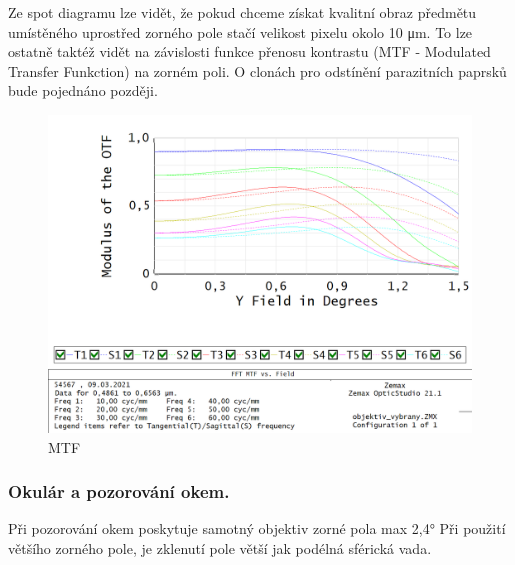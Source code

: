\documentclass[
]{article}
\begin{document}
Ze spot diagramu lze vidět, že pokud chceme získat kvalitní obraz
předmětu umístěného uprostřed zorného pole stačí velikost pixelu okolo
10 μm. To lze ostatně taktéž vidět na závislosti funkce přenosu
kontrastu (MTF - Modulated Transfer Funkction) na zorném poli. O clonách
pro odstínění parazitních paprsků bude pojednáno později.

\begin{figure}
\centering
\includegraphics{imgs/FFTMTFvsField_dublet.png}
\caption{MTF}
\end{figure}

\hypertarget{okuluxe1r-a-pozorovuxe1nuxed-okem.}{%
\subsubsection{Okulár a pozorování
okem.}\label{okuluxe1r-a-pozorovuxe1nuxed-okem.}}

Při pozorování okem poskytuje samotný objektiv zorné pola max 2,4° Při
použití většího zorného pole, je zklenutí pole větší jak podélná
sférická vada.
\end{document}
